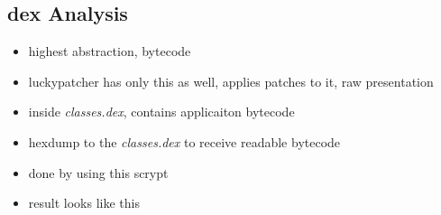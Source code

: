 \subsection{dex Analysis} \label{subsection:tools-dex}
\begin{itemize}
    \item highest abstraction, bytecode
    \item luckypatcher has only this as well, applies patches to it, raw presentation
    \item inside \textit{classes.dex}, contains applicaiton bytecode
    \item hexdump to the \textit{classes.dex} to receive readable bytecode
    \item done by using this scrypt
    \item result looks like this
\end{itemize}
